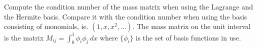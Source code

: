 \begin{exercise}
Compute the condition number of the mass matrix when using the Lagrange and the Hermite basis. Compare it with the condition
number when using the basis consisting of monomials, ie. $(1, x, x^2, \ldots)$.   
	The mass matrix on the unit interval  is the matrix $M_{ij} = \int_0^1 \phi_i \phi_j \, dx $ where $\{\phi_i\}$ is 
	the set of basis functions in use. 
\end{exercise}





